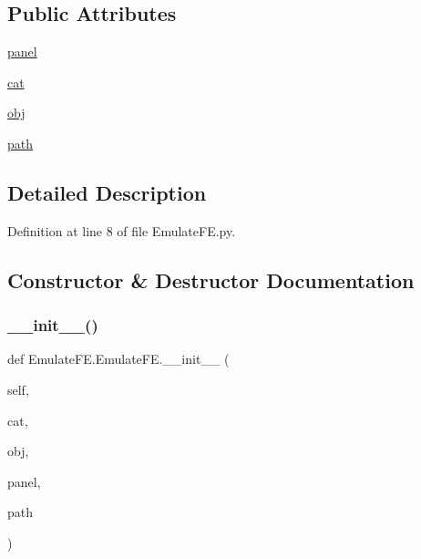 \subsection*{Public Attributes}
\begin{DoxyCompactItemize}
\item 
\hyperlink{classproc_1_1proc_a36068ce6d978f4f4dde164e7bdc2e057}{panel}
\item 
\hyperlink{classobject_1_1object_af114388a80cca208c152ffeca0e89e23}{cat}
\item 
\hyperlink{classobject_1_1object_a82b61e7cd7e18b1f9de10fc832e5b75e}{obj}
\item 
\hyperlink{classobject_1_1object_a2a518f960961d791b0f900a90c3cd287}{path}
\end{DoxyCompactItemize}


\subsection{Detailed Description}


Definition at line 8 of file Emulate\+F\+E.\+py.



\subsection{Constructor \& Destructor Documentation}
\mbox{\label{classEmulateFE_1_1EmulateFE_aa9871941190d71b8fa8e4b70ee66f9e4}} 
\subsubsection{\texorpdfstring{\+\_\+\+\_\+init\+\_\+\+\_\+()}{\_\_init\_\_()}}
{\footnotesize\ttfamily def Emulate\+F\+E.\+Emulate\+F\+E.\+\_\+\+\_\+init\+\_\+\+\_\+ (\begin{DoxyParamCaption}\item[{}]{self,  }\item[{}]{cat,  }\item[{}]{obj,  }\item[{}]{panel,  }\item[{}]{path }\end{DoxyParamCaption})}



